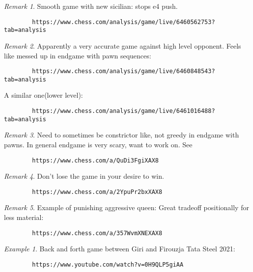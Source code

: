 \documentclass[11pt]{article}
\theoremstyle{remark}
\newtheorem{remark}{Remark}
\newtheorem{example}{Example}
\begin{document}
\begin{remark}
	Smooth game with new sicilian: stops e4 push.
	\begin{verbatim}
		https://www.chess.com/analysis/game/live/6460562753?tab=analysis
	\end{verbatim}
\end{remark}

\begin{remark}
	Apparently a very accurate game against high level opponent. Feels like messed up in endgame with pawn sequences:
	\begin{verbatim}
		https://www.chess.com/analysis/game/live/6460848543?tab=analysis
	\end{verbatim}

	A similar one(lower level):
	\begin{verbatim}
		https://www.chess.com/analysis/game/live/6461016488?tab=analysis
	\end{verbatim}
\end{remark}

\begin{remark}
	Need to sometimes be constrictor like, not greedy in endgame with pawns. In general endgame is very scary, want to work on. See
	\begin{verbatim}
		https://www.chess.com/a/QuDi3FgiXAX8
	\end{verbatim}
\end{remark}

\begin{remark}
	Don't lose the game in your desire to win.
	\begin{verbatim}
		https://www.chess.com/a/2YpuPr2bxXAX8
	\end{verbatim}
\end{remark}

\begin{remark}
	Example of punishing aggressive queen: Great tradeoff positionally for less material: 
	\begin{verbatim}
		https://www.chess.com/a/357WvmXNEXAX8
	\end{verbatim}
\end{remark}

\begin{example}
	Back and forth game between Giri and Firouzja Tata Steel 2021: 
	\begin{verbatim}
		https://www.youtube.com/watch?v=0H9QLP5giAA
	\end{verbatim}
\end{example}
\end{document}
